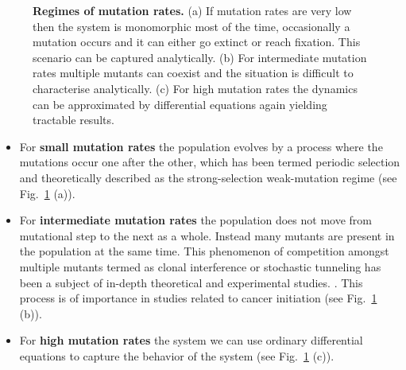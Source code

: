 \documentclass[oneside,11pt,a4paper]{book}
\begin{document}
\begin{figure}[h]
  \begin{center}
    \caption{\textbf{Regimes of mutation rates.}
\small{(a) If mutation rates are very low then the system is monomorphic most of the time, occasionally a mutation occurs and it can either go extinct or reach fixation.
This scenario can be captured analytically. (b) For intermediate mutation rates multiple mutants can coexist and the situation is difficult to characterise analytically.
(c) For high mutation rates the dynamics can be approximated by differential equations again yielding tractable results.}
}
    \label{mutspectrum}
  \end{center}
\end{figure}
%
\begin{itemize}

\item For \textbf{small mutation rates} the population evolves by a process where the mutations occur one 
after the other, which has been termed periodic selection \citep{atwood:1951aa} and theoretically described as the strong-selection 
weak-mutation regime \citep{gillespie:1983aa,gillespie:2004bo} (see Fig.\ \ref{mutspectrum} (a)).
\item For \textbf{intermediate mutation rates} the population does not move from mutational step to the next as a whole.
Instead many mutants are present in the population at the same time.
This phenomenon of competition amongst multiple mutants termed as clonal interference or stochastic tunneling has been a subject of in-depth theoretical and experimental studies. \citep{gerrish:1998aa,elena:1998aa,elena:2003aa,iwasa:2004aa,park:2007aa}.
This process is of importance in studies related to cancer initiation \citep{iwasa:2004aa,michor:2004aa,beerenwinkel:2007aa,beerenwinkel:2007qy,bozic:2010aa} (see Fig.\ \ref{mutspectrum} (b)).
\item For \textbf{high mutation rates} the system we can use ordinary differential equations to capture the behavior of the system (see Fig.\ \ref{mutspectrum} (c)).

\end{itemize}
\end{document}
